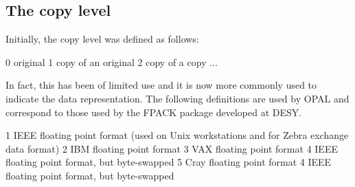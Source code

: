 \subsection{The copy level}
\par
Initially, the copy level was defined as follows:
\begin{XMP}
     0       original
     1       copy of an original
     2       copy of a copy
     ...
\end{XMP}
\par
In fact, this has been of limited use and it is now more
commonly used to indicate the data representation. The
following definitions are used by OPAL and correspond to
those used by the FPACK package developed at DESY.
\begin{XMP}
     1       IEEE floating point format (used on Unix workstations and 
                                         for Zebra exchange data format) 
     2       IBM  floating point format
     3       VAX  floating point format
     4       IEEE floating point format, but byte-swapped
     5       Cray floating point format
     4       IEEE floating point format, but byte-swapped
\end{XMP}
